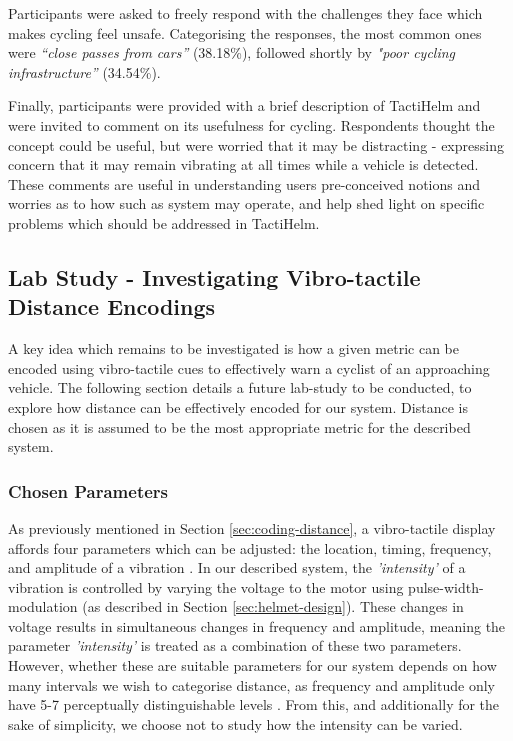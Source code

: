\documentclass{interim}
\begin{document}
Participants were asked to freely respond with the challenges they face which makes cycling feel unsafe. Categorising the responses, the most common ones were \textit{“close passes from cars”} (38.18\%), followed shortly by \textit{"poor cycling infrastructure”} (34.54\%).

Finally, participants were provided with a brief description of TactiHelm and were invited to comment on its usefulness for cycling. Respondents thought the concept could be useful, but were worried that it may be distracting - expressing concern that it may remain vibrating at all times while a vehicle is detected. These comments are useful in understanding users pre-conceived notions and worries as to how such as system may operate, and help shed light on specific problems which should be addressed in TactiHelm.


\subsection{Lab Study - Investigating Vibro-tactile Distance Encodings}\label{sec:lab-study}
A key idea which remains to be investigated is how a given metric can be encoded using vibro-tactile cues to effectively warn a cyclist of an approaching vehicle. The following section details a future lab-study to be conducted, to explore how distance can be effectively encoded for our system. Distance is chosen as it is assumed to be the most appropriate metric for the described system.

\subsubsection{Chosen Parameters}
As previously mentioned in Section \ref{sec:coding-distance}, a vibro-tactile display affords four parameters which can be adjusted: the location, timing, frequency, and amplitude of a vibration \cite{guidelines}. In our described system, the \textit{'intensity'} of a vibration is controlled by varying the voltage to the motor using pulse-width-modulation (as described in Section \ref{sec:helmet-design}). These changes in voltage results in simultaneous changes in frequency and amplitude, meaning the parameter \textit{'intensity'} is treated as a combination of these two parameters. However, whether these are suitable parameters for our system depends on how many intervals we wish to categorise distance, as frequency and amplitude only have 5-7 perceptually distinguishable levels \cite{guidelines}. From this, and additionally for the sake of simplicity, we choose not to study how the intensity can be varied. 
\end{document}
